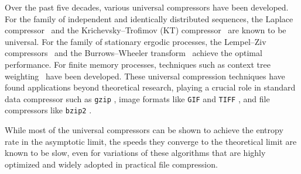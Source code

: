 \documentclass[11pt]{article}
\begin{document}
Over the past five decades, various universal compressors have been developed. For the family of independent and identically distributed sequences, the Laplace compressor~\cite{Laplace1995} and the Krichevsky--Trofimov (KT) compressor~\cite{Krichevsky--Trofimov1981} are known to be universal. For the family of stationary ergodic processes, the Lempel--Ziv compressors~\cite{Lempel--Ziv77,Lempel--Ziv78} and the Burrows--Wheeler transform~\cite{effros2002universal} achieve the optimal performance.
For finite memory processes, techniques such as context tree weighting~\cite{willems1995context} have been developed. These universal compression techniques have found applications beyond theoretical research, playing a crucial role in standard data compressor such as \texttt{gzip} \cite{gzip}, image formats like \texttt{GIF}\cite{gif} and \texttt{TIFF} \cite{TIFF6}, and file compressors like \texttt{bzip2} \cite{bzip2}.

While most of the universal compressors can be shown to achieve the entropy rate in the asymptotic limit, the speeds they converge to the theoretical limit are known to be slow, even for variations of these algorithms that are highly optimized and widely adopted in practical file compression.
\end{document}
